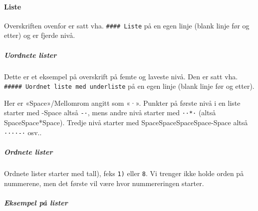 \documentclass[
]{article}
\begin{document}
\hypertarget{liste}{%
\paragraph{Liste}\label{liste}}

Overskriften ovenfor er satt vha. \texttt{\#\#\#\#\ Liste} på en egen
linje (blank linje før og etter) og er fjerde nivå.

\hypertarget{uordnete-lister}{%
\subparagraph{Uordnete lister}\label{uordnete-lister}}

Dette er et eksempel på overskrift på femte og laveste nivå. Den er satt
vha. \texttt{\#\#\#\#\#\ Uordnet\ liste\ med\ underliste} på en egen
linje (blank linje før og etter).

Her er «Space»/Mellomrom angitt som «·». Punkter på første nivå i en
liste starter med -Space altså \texttt{-·}, mens andre nivå starter med
\texttt{··*·} (altså SpaceSpace*Space). Tredje nivå starter med
SpaceSpaceSpaceSpace-Space altså \texttt{····-·} osv..

\hypertarget{ordnete-lister}{%
\subparagraph{Ordnete lister}\label{ordnete-lister}}

Ordnete lister starter med tall), feks \texttt{1)} eller \texttt{8}. Vi
trenger ikke holde orden på nummerene, men det første vil være hvor
nummereringen starter.

\hypertarget{eksempel-puxe5-lister}{%
\subparagraph{Eksempel på lister}\label{eksempel-puxe5-lister}}
\end{document}
